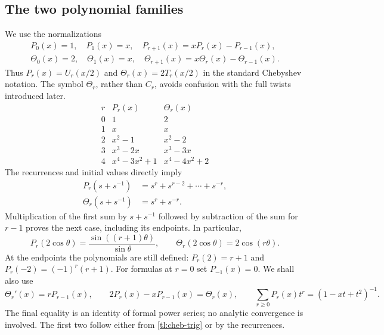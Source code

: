 \documentclass[a4paper,11pt,oneside,reqno]{amsart}
\theoremstyle{definition}
\numberwithin{equation}{section}
\begin{document}
	\subsection{The two polynomial families}
	We use the normalizations
	\begin{equation}\label{tl:cheb-def}
		\begin{gathered}
			P_0(x)=1,\quad P_1(x)=x,\quad P_{r+1}(x)=xP_r(x)-P_{r-1}(x),\\
			\Theta_0(x)=2,\quad\Theta_1(x)=x,\quad
			\Theta_{r+1}(x)=x\Theta_r(x)-\Theta_{r-1}(x).
		\end{gathered}
	\end{equation}
	Thus $P_r(x)=U_r(x/2)$ and $\Theta_r(x)=2T_r(x/2)$ in the
	standard Chebyshev notation.  The symbol $\Theta_r$, rather than
	$C_r$, avoids confusion with the full twists introduced later.
	\[
	\begin{array}{c|c|c}
		r&P_r(x)&\Theta_r(x)\\\hline
		0&1&2\\1&x&x\\2&x^2-1&x^2-2\\
		3&x^3-2x&x^3-3x\\4&x^4-3x^2+1&x^4-4x^2+2
	\end{array}
	\]
	The recurrences and initial values directly imply
	\begin{equation}\label{tl:cheb-laurent}
		\begin{aligned}
			P_r(s+s^{-1})&=s^r+s^{r-2}+\cdots+s^{-r},\\
			\Theta_r(s+s^{-1})&=s^r+s^{-r}.
		\end{aligned}
	\end{equation}
	Multiplication of the first sum by $s+s^{-1}$ followed by subtraction
	of the sum for $r-1$ proves the next case, including its endpoints.
	In particular,
	\begin{equation}\label{tl:cheb-trig}
		P_r(2\cos\theta)=\frac{\sin((r+1)\theta)}{\sin\theta},\qquad
		\Theta_r(2\cos\theta)=2\cos(r\theta).
	\end{equation}
	At the endpoints the polynomials are still defined:
	$P_r(2)=r+1$ and $P_r(-2)=(-1)^r(r+1)$.
	For formulas at $r=0$ set $P_{-1}(x)=0$. We shall also use
	\begin{equation}\label{tl:cheb-extra}
		\Theta_r'(x)=rP_{r-1}(x),\qquad
		2P_r(x)-xP_{r-1}(x)=\Theta_r(x),\qquad
		\sum_{r\ge0}P_r(x)t^r=(1-xt+t^2)^{-1}.
	\end{equation}
	The final equality is an identity of formal power series; no analytic
	convergence is involved.  The first two follow either from
	\eqref{tl:cheb-trig} or by the recurrences.
	
\end{document}
